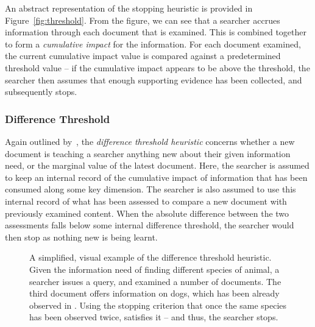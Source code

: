 An abstract representation of the stopping heuristic is provided in Figure~\ref{fig:threshold}. From the figure, we can see that a searcher accrues information through each document that is examined. This is combined together to form a \emph{cumulative impact} for the information. For each document examined, the current cumulative impact value is compared against a predetermined threshold value -- if the cumulative impact appears to be above the threshold, the searcher then assumes that enough supporting evidence has been collected, and subsequently stops.

\subsubsection{Difference Threshold}
Again outlined by~\citep{nickles1995judgment}, the \emph{difference threshold heuristic} concerns whether a new document is teaching a searcher anything new about their given information need, or the marginal value of the latest document. Here, the searcher is assumed to keep an internal record of the cumulative impact of information that has been consumed along some key dimension. The searcher is also assumed to use this internal record of what has been assessed to compare a new document with previously examined content. When the absolute difference between the two assessments falls below some internal difference threshold, the searcher would then stop as nothing new is being learnt.

\begin{figure}[t!]
    \centering
    \caption[Difference threshold heuristic]{A simplified, visual example of the difference threshold heuristic. Given the information need of finding different species of animal, a searcher issues a query, and examined a number of documents. The third document offers information on dogs, which has been already observed in . Using the stopping criterion that once the same species has been observed twice,  satisfies it – and thus, the searcher stops.}
    \label{fig:difference_heuristic}
\end{figure}

